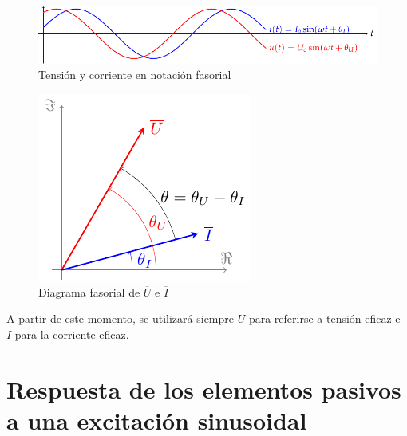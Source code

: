 	\begin{figure}[H]
		\centering
		\includegraphics[width=.9\linewidth]{../figs/ondasTensionCorriente.pdf}
		\caption{Tensión y corriente en notación fasorial}
		\label{fig.ondasTensionCorriente}
	\end{figure}
	
	
	\begin{figure}[H]
		\centering
		\includegraphics[width=0.3\linewidth]{../figs/fasorTensionCorriente.pdf}
		\caption{Diagrama fasorial de $\overline{U}$ e  $\overline{I}$}
		\label{fig.fasortensioncorriente}
	\end{figure}
	
	\begin{remark}
		A partir de este momento, se utilizará siempre $U$ para referirse a tensión eficaz e $I$ para la corriente eficaz.
	\end{remark}
	
	\section{Respuesta de los elementos pasivos a una excitación sinusoidal}
	
